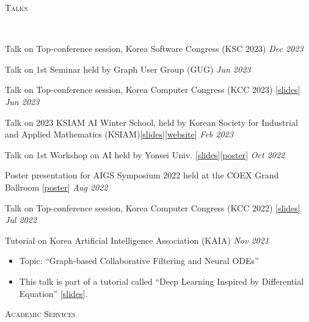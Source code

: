 \documentclass[10pt]{article}
\newenvironment{changemargin}[2]{
  \begin{list}{}{
    \setlength{\topsep}{0pt}
    \setlength{\leftmargin}{#1}
    \setlength{\rightmargin}{#2}
    \setlength{\listparindent}{\parindent}
    \setlength{\itemindent}{\parindent}
    \setlength{\parsep}{\parskip}
  }
  \item[]}{\end{list}
}
\newcommand{\lineover}{
	\begin{changemargin}{-0.05in}{-0.05in}
		\vspace*{-8pt}
		\hrulefill \\
		\vspace*{-2pt}
	\end{changemargin}
}
\newcommand{\header}[1]{
	\begin{changemargin}{-0.5in}{-0.5in}
		\scshape{#1}\\
  	\lineover
	\end{changemargin}
}
\newcommand{\award}[2]{
	{#1} \hfill \emph{#2}\\ \medskip
}
\newenvironment{body} {
	\vspace*{-16pt}
	\begin{changemargin}{-0.25in}{-0.5in}
  }
	{\end{changemargin}
}
\begin{document}
\medskip
\pagebreak
\header{Talks}

\begin{body}
	\vspace{14pt}
\award{Talk on Top-conference session, Korea Software Congress (KSC 2023)} {Dec 2023}
\award{Talk on 1st Seminar held by Graph User Group (GUG)}{Jun 2023}
\award{Talk on Top-conference session, Korea Computer Congress (KCC 2023) [\href{https://www.dropbox.com/s/34h6pmr7ftdiuzr/BSPM-KCC23.pptx?dl=0}{slides}]}{Jun 2023}
\award{Talk on 2023 KSIAM AI Winter School, held by Korean Society for Industrial and Applied Mathematics (KSIAM)[\href{https://www.dropbox.com/s/p4sd5h40hcuxcob/KSIAM23-Tutorial-ODE-RecSys.pdf?dl=0}{slides}][\href{https://ksiam.org/Conference/ConferenceView.asp?AC=3&CODE=CD20230101&CpPage=\#CONF}{website}]}{Feb 2023}
\award{Talk on 1st Workshop on AI held by Yonsei Univ. [\href{https://www.dropbox.com/s/9au5xx13qa2l529/AAAI22_workshop.pdf?dl=0}{slides}][\href{https://www.dropbox.com/s/pibzd51d76zy907/AAAI22-Yonsei_AI_Workshop.pdf?dl=0}{poster}]}{Oct 2022}
\award{Poster presentation for AIGS Symposium 2022 held at the COEX Grand Ballroom [\href{https://www.dropbox.com/s/gfjsizak9s4cn9o/AAAI22-AIGS.pdf?dl=0}{poster}]}{Aug 2022}
\award{Talk on Top-conference session, Korea Computer Congress (KCC 2022) [\href{https://www.dropbox.com/s/22d9d92ns8uv9qw/AAAI22_KCC22.pdf?dl=0}{slides}]}{Jul 2022}
\award{Tutorial on Korea Artificial Intelligence Association (KAIA)}{Nov 2021}
	\begin{itemize} \itemsep -0pt  %
        \item Topic: ``Graph-based Collaborative Filtering and Neural ODEs''
		\item This talk is part of a tutorial called ``Deep Learning Inspired by Differential Equation'' [\href{https://www.dropbox.com/s/1xn8xhd6llmhblz/%5BKAIA2021%5DTutorial-LT-OCF.pdf?dl=0}{slides}].
  	\end{itemize}
\end{body}

\medskip

\header{Academic Services}
\end{document}
